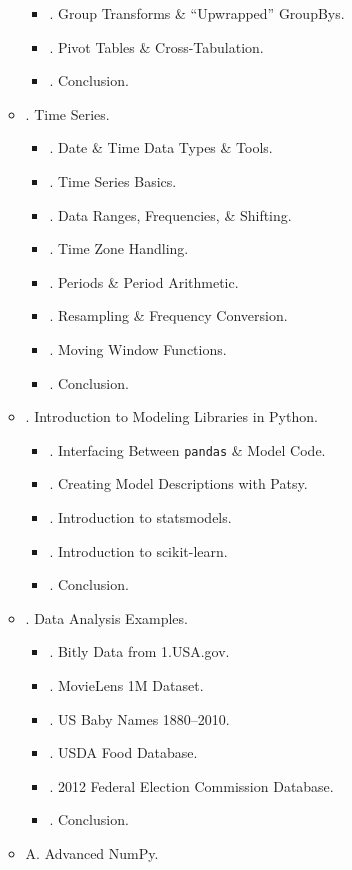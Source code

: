 \documentclass{article}
\begin{document}
\begin{enumerate}
\begin{itemize}
\begin{itemize}
			\item {. Group Transforms \& ``Upwrapped'' GroupBys.}
			\item {. Pivot Tables \& Cross-Tabulation.}
			\item {. Conclusion.}
		\end{itemize}
		\item {. Time Series.}
		\begin{itemize}
			\item {. Date \& Time Data Types \& Tools.}
			\item {. Time Series Basics.}
			\item {. Data Ranges, Frequencies, \& Shifting.}
			\item {. Time Zone Handling.}
			\item {. Periods \& Period Arithmetic.}
			\item {. Resampling \& Frequency Conversion.}
			\item {. Moving Window Functions.}
			\item {. Conclusion.}
		\end{itemize}
		\item {. Introduction to Modeling Libraries in Python.}
		\begin{itemize}
			\item {. Interfacing Between {\tt pandas} \& Model Code.}
			\item {. Creating Model Descriptions with Patsy.}
			\item {. Introduction to statsmodels.}
			\item {. Introduction to scikit-learn.}
			\item {. Conclusion.}
		\end{itemize}
		\item {. Data Analysis Examples.}
		\begin{itemize}
			\item {. Bitly Data from 1.USA.gov.}
			\item {. MovieLens 1M Dataset.}
			\item {. US Baby Names 1880--2010.}
			\item {. USDA Food Database.}
			\item {. 2012 Federal Election Commission Database.}
			\item {. Conclusion.}
		\end{itemize}
		\item {\sf A. Advanced NumPy.}

\end{itemize}
\end{enumerate}
\end{document}
